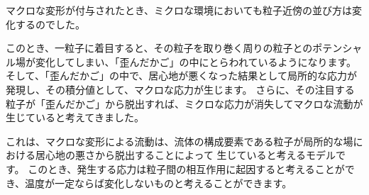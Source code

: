 \documentclass[uplatex,dvipdfmx,a4paper,11pt]{jsarticle}
\begin{document}
マクロな変形が付与されたとき、ミクロな環境においても粒子近傍の並び方は変化するのでした。

このとき、一粒子に着目すると、その粒子を取り巻く周りの粒子とのポテンシャル場が変化してしまい、「歪んだかご」の中にとらわれているようになります。
そして、「歪んだかご」の中で、居心地が悪くなった結果として局所的な応力が発現し、その積分値として、マクロな応力が生じます。
さらに、その注目する粒子が「歪んだかご」から脱出すれば、ミクロな応力が消失してマクロな流動が生じていると考えてきました。

これは、マクロな変形による流動は、流体の構成要素である粒子が局所的な場における居心地の悪さから脱出することによって
生じていると考えるモデルです。
このとき、発生する応力は粒子間の相互作用に起因すると考えることができ、温度が一定ならば変化しないものと考えることができます。

\end{document}
